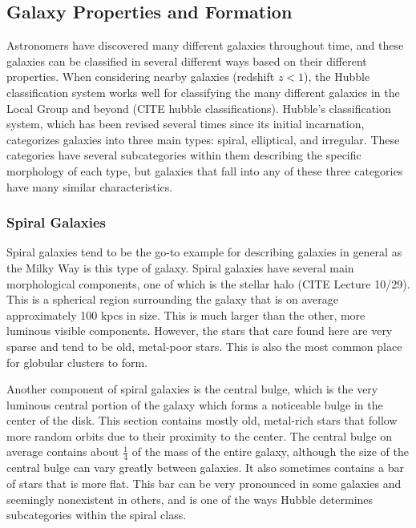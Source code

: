 \documentclass[12pt]{article}
\begin{document}
\subsection{Galaxy Properties and Formation}
Astronomers have discovered many different galaxies throughout time, and these
galaxies can be classified in several different ways based on their different
properties.  When considering nearby galaxies (redshift $z < 1$), the Hubble
classification system works well for classifying the many different galaxies in
the Local Group and beyond (CITE hubble classifications).  Hubble's
classification system, which has been revised several times since its initial
incarnation, categorizes galaxies into three main types: spiral, elliptical, and
irregular.  These categories have several subcategories within them describing
the specific morphology of each type, but galaxies that fall into any of these
three categories have many similar characteristics.

    \subsubsection{Spiral Galaxies}
    Spiral galaxies tend to be the go-to example for describing galaxies in general
    as the Milky Way is this type of galaxy.  Spiral galaxies have several main
    morphological components, one of which is the stellar halo (CITE Lecture 10/29).
    This is a spherical region surrounding the galaxy that is on average
    approximately 100 kpcs in size.  This is much larger than the other, more
    luminous visible components.  However, the stars that care found here are very
    sparse and tend to be old, metal-poor stars.  This is also the most common place
    for globular clusters to form.

    Another component of spiral galaxies is the central bulge, which is the very
    luminous central portion of the galaxy which forms a noticeable bulge in the
    center of the disk.  This section contains mostly old, metal-rich stars that
    follow more random orbits due to their proximity to the center.  The central
    bulge on average contains about $\frac{1}{4}$ of the mass of the entire
    galaxy, although the size of the central bulge can vary greatly between
    galaxies.  It also sometimes contains a bar of stars that is more flat.
    This bar can be very pronounced in some galaxies and seemingly nonexistent
    in others, and is one of the ways Hubble determines subcategories within the
    spiral class.
\end{document}
